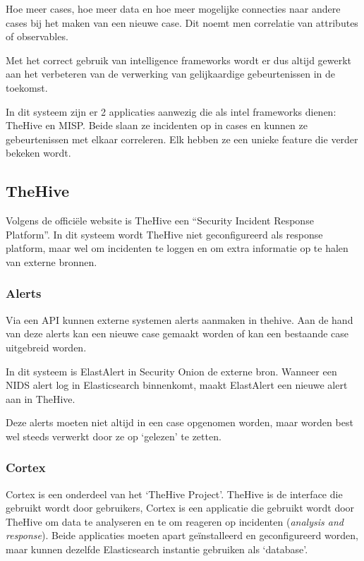 \documentclass[a4paper,12pt]{report}
\begin{document}
Hoe meer cases, hoe meer data en hoe meer mogelijke connecties naar andere cases bij het maken van een nieuwe case.
Dit noemt men correlatie van attributes of observables.

Met het correct gebruik van intelligence frameworks wordt er dus altijd gewerkt aan het verbeteren van de verwerking van gelijkaardige gebeurtenissen in de toekomst.

In dit systeem zijn er 2 applicaties aanwezig die als intel frameworks dienen: TheHive en MISP.
Beide slaan ze incidenten op in cases en kunnen ze gebeurtenissen met elkaar correleren.
Elk hebben ze een unieke feature die verder bekeken wordt.

\subsection{TheHive}
Volgens de officiële website is TheHive een ``Security Incident Response Platform''.
\autocite{thehive:home}
In dit systeem wordt TheHive niet geconfigureerd als response platform, maar wel om incidenten te loggen en om extra informatie op te halen van externe bronnen.

\subsubsection{Alerts}
Via een API kunnen externe systemen alerts aanmaken in thehive.
Aan de hand van deze alerts kan een nieuwe case gemaakt worden of kan een bestaande case uitgebreid worden.

In dit systeem is ElastAlert in Security Onion de externe bron.
Wanneer een NIDS alert log in Elasticsearch binnenkomt, maakt ElastAlert een nieuwe alert aan in TheHive.

Deze alerts moeten niet altijd in een case opgenomen worden, maar worden best wel steeds verwerkt door ze op `gelezen' te zetten.

\subsubsection{Cortex}
\label{sec:cortex}
Cortex is een onderdeel van het `TheHive Project'.
TheHive is de interface die gebruikt wordt door gebruikers, Cortex is een applicatie die gebruikt wordt door TheHive om data te analyseren en te om reageren op incidenten (\emph{analysis and response}).
Beide applicaties moeten apart geïnstalleerd en geconfigureerd worden, maar kunnen dezelfde Elasticsearch instantie gebruiken als `database'.
\end{document}
